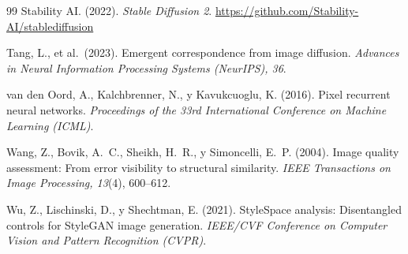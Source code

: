 \documentclass[12pt, a4paper, twoside]{book}
\begin{document}
\begin{thebibliography}{99}
Stability AI. (2022).
\textit{Stable Diffusion 2}.
\url{https://github.com/Stability-AI/stablediffusion}

Tang, L., et al.\ (2023).
Emergent correspondence from image diffusion.
\textit{Advances in Neural Information Processing Systems (NeurIPS), 36}.

van den Oord, A., Kalchbrenner, N., y Kavukcuoglu, K. (2016).
Pixel recurrent neural networks.
\textit{Proceedings of the 33rd International Conference on Machine Learning (ICML)}.

Wang, Z., Bovik, A.~C., Sheikh, H.~R., y Simoncelli, E.~P. (2004).
Image quality assessment: From error visibility to structural similarity.
\textit{IEEE Transactions on Image Processing, 13}(4), 600--612.

Wu, Z., Lischinski, D., y Shechtman, E. (2021).
StyleSpace analysis: Disentangled controls for StyleGAN image generation.
\textit{IEEE/CVF Conference on Computer Vision and Pattern Recognition (CVPR)}.

\end{thebibliography}
\end{document}
